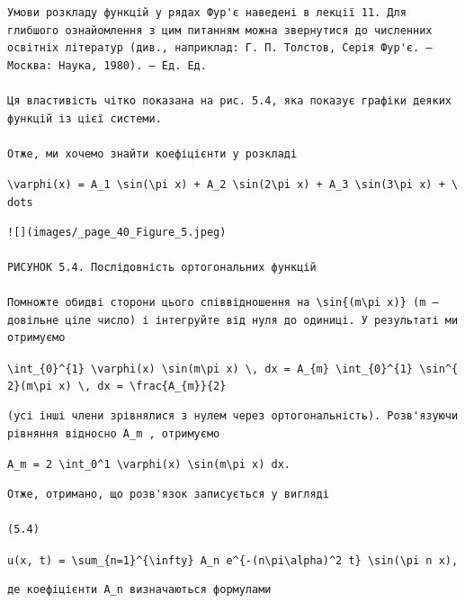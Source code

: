 \documentclass[
  ukrainian,
]{article}
\begin{document}
\begin{verbatim}
Умови розкладу функцій у рядах Фур'є наведені в лекції 11. Для глибшого ознайомлення з цим питанням можна звернутися до численних освітніх літератур (див., наприклад: Г. П. Толстов, Серія Фур'є. — Москва: Наука, 1980). — Ед. Ед.

Ця властивість чітко показана на рис. 5.4, яка показує графіки деяких функцій із цієї системи.

Отже, ми хочемо знайти коефіцієнти у розкладі
\end{verbatim}

\texttt{\textbackslash{}varphi(x)\ =\ A\_1\ \textbackslash{}sin(\textbackslash{}pi\ x)\ +\ A\_2\ \textbackslash{}sin(2\textbackslash{}pi\ x)\ +\ A\_3\ \textbackslash{}sin(3\textbackslash{}pi\ x)\ +\ \textbackslash{}dots}

\begin{verbatim}
![](images/_page_40_Figure_5.jpeg)

РИСУНОК 5.4. Послідовність ортогональних функцій

Помножте обидві сторони цього співвідношення на \sin{(m\pi x)} (m — довільне ціле число) і інтегруйте від нуля до одиниці. У результаті ми отримуємо
\end{verbatim}

\texttt{\textbackslash{}int\_\{0\}\^{}\{1\}\ \textbackslash{}varphi(x)\ \textbackslash{}sin(m\textbackslash{}pi\ x)\ \textbackslash{},\ dx\ =\ A\_\{m\}\ \textbackslash{}int\_\{0\}\^{}\{1\}\ \textbackslash{}sin\^{}\{2\}(m\textbackslash{}pi\ x)\ \textbackslash{},\ dx\ =\ \textbackslash{}frac\{A\_\{m\}\}\{2\}}

\begin{verbatim}
(усі інші члени зрівнялися з нулем через ортогональність). Розв'язуючи рівняння відносно A_m , отримуємо
\end{verbatim}

\texttt{A\_m\ =\ 2\ \textbackslash{}int\_0\^{}1\ \textbackslash{}varphi(x)\ \textbackslash{}sin(m\textbackslash{}pi\ x)\ dx.}

\begin{verbatim}
Отже, отримано, що розв'язок записується у вигляді

(5.4)
\end{verbatim}

\texttt{u(x,\ t)\ =\ \textbackslash{}sum\_\{n=1\}\^{}\{\textbackslash{}infty\}\ A\_n\ e\^{}\{-(n\textbackslash{}pi\textbackslash{}alpha)\^{}2\ t\}\ \textbackslash{}sin(\textbackslash{}pi\ n\ x),}

\begin{verbatim}
де коефіцієнти A_n визначаються формулами
\end{verbatim}
\end{document}
